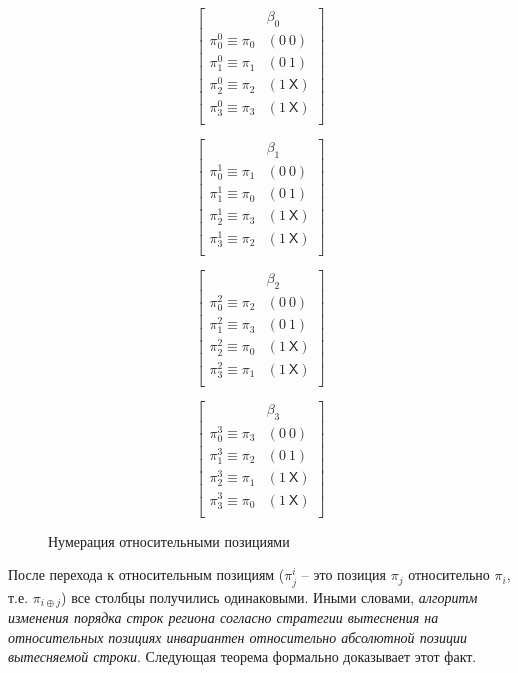 \begin{figure}[h]
\parbox{0.24\textwidth}{
$$ \left[
  \begin{array}{c|c}
          & \beta_0 \\ \hline
    \pi^0_0 \equiv \pi_0 & (0~0) \\
    \pi^0_1 \equiv \pi_1 & (0~1) \\
    \pi^0_2 \equiv \pi_2 & (1~\textsf{X}) \\
    \pi^0_3 \equiv \pi_3 & (1~\textsf{X}) \\
  \end{array}
\right]
$$
}\parbox{0.24\textwidth}{
$$ \left[
  \begin{array}{c|c}
          & \beta_1 \\ \hline
    \pi^1_0 \equiv \pi_1 & (0~0) \\
    \pi^1_1 \equiv \pi_0 & (0~1) \\
    \pi^1_2 \equiv \pi_3 & (1~\textsf{X}) \\
    \pi^1_3 \equiv \pi_2 & (1~\textsf{X}) \\
  \end{array}
\right]
$$
}\parbox{0.24\textwidth}{
$$ \left[
  \begin{array}{c|c}
          & \beta_2 \\ \hline
    \pi^2_0 \equiv \pi_2 & (0~0) \\
    \pi^2_1 \equiv \pi_3 & (0~1) \\
    \pi^2_2 \equiv \pi_0 & (1~\textsf{X}) \\
    \pi^2_3 \equiv \pi_1 & (1~\textsf{X}) \\
  \end{array}
\right]
$$
}\parbox{0.24\textwidth}{
$$ \left[
  \begin{array}{c|c}
          & \beta_3 \\ \hline
    \pi^3_0 \equiv \pi_3 & (0~0) \\
    \pi^3_1 \equiv \pi_2 & (0~1) \\
    \pi^3_2 \equiv \pi_1 & (1~\textsf{X}) \\
    \pi^3_3 \equiv \pi_0 & (1~\textsf{X}) \\
  \end{array}
\right]
$$
}
\caption{Нумерация относительными позициями}\label{fig:plru_def_step2}
\end{figure}

После перехода к относительным позициям ($\pi^i_j$ -- это позиция
$\pi_j$ относительно $\pi_i$, т.е. $\pi_{i \oplus j}$) все столбцы получились одинаковыми.
Иными словами, \emph{алгоритм изменения порядка строк региона согласно стратегии
вытеснения \PseudoLRU на относительных позициях инвариантен
относительно абсолютной позиции вытесняемой строки}. Следующая теорема
формально доказывает этот факт.

